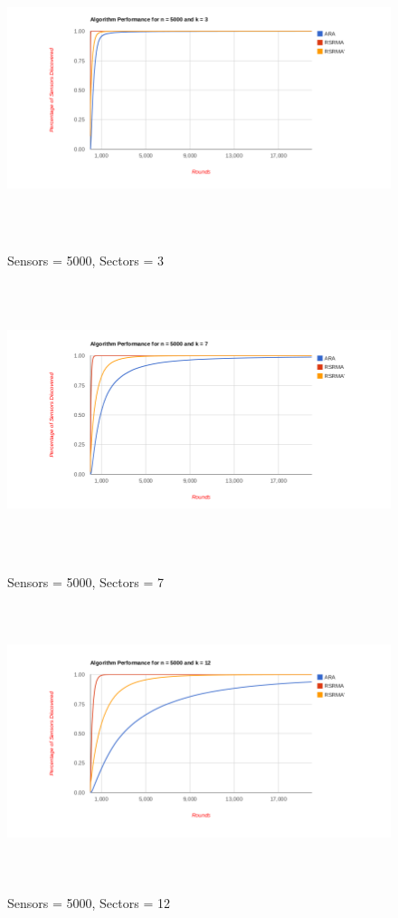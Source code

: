 \begin{figure}[ht]
\caption{Sensors = 5000, Sectors = 3}
\includegraphics[height = 8cm]{pics/graph5000k3.png}\\[0.5cm]    
\label{fig:n5000k3}
\end{figure}

\begin{figure}[ht]
\caption{Sensors = 5000, Sectors = 7}
\includegraphics[height = 8cm]{pics/graph5000k7.png}\\[0.5cm]   
\label{fig:n5000k7} 
\end{figure}

\begin{figure}[ht]
\caption{Sensors = 5000, Sectors = 12}
\includegraphics[height = 8cm]{pics/graph5000k12.png}\\[0.5cm] 
\label{fig:n5000k12}   
\end{figure}

